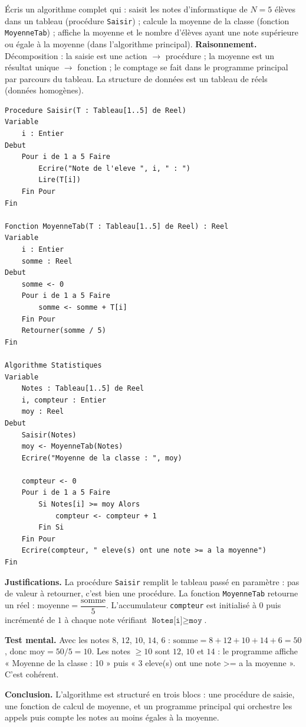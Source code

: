 \documentclass[11pt]{article}
\begin{document}
\begin{exoresolu}
Écris un algorithme complet qui : saisit les notes d'informatique de $N = 5$ élèves dans un tableau (procédure \texttt{Saisir}) ; calcule la moyenne de la classe (fonction \texttt{MoyenneTab}) ; affiche la moyenne et le nombre d'élèves ayant une note supérieure ou égale à la moyenne (dans l'algorithme principal).
\tcblower
\textbf{Raisonnement.} Décomposition : la saisie est une action $\rightarrow$ procédure ; la moyenne est un résultat unique $\rightarrow$ fonction ; le comptage se fait dans le programme principal par parcours du tableau. La structure de données est un tableau de réels (données homogènes).

\begin{lstlisting}
Procedure Saisir(T : Tableau[1..5] de Reel)
Variable
    i : Entier
Debut
    Pour i de 1 a 5 Faire
        Ecrire("Note de l'eleve ", i, " : ")
        Lire(T[i])
    Fin Pour
Fin

Fonction MoyenneTab(T : Tableau[1..5] de Reel) : Reel
Variable
    i : Entier
    somme : Reel
Debut
    somme <- 0
    Pour i de 1 a 5 Faire
        somme <- somme + T[i]
    Fin Pour
    Retourner(somme / 5)
Fin

Algorithme Statistiques
Variable
    Notes : Tableau[1..5] de Reel
    i, compteur : Entier
    moy : Reel
Debut
    Saisir(Notes)
    moy <- MoyenneTab(Notes)
    Ecrire("Moyenne de la classe : ", moy)

    compteur <- 0
    Pour i de 1 a 5 Faire
        Si Notes[i] >= moy Alors
            compteur <- compteur + 1
        Fin Si
    Fin Pour
    Ecrire(compteur, " eleve(s) ont une note >= a la moyenne")
Fin
\end{lstlisting}

\textbf{Justifications.} La procédure \texttt{Saisir} remplit le tableau passé en paramètre : pas de valeur à retourner, c'est bien une procédure. La fonction \texttt{MoyenneTab} retourne un réel : $\text{moyenne} = \dfrac{\text{somme}}{5}$. L'accumulateur \texttt{compteur} est initialisé à $0$ puis incrémenté de $1$ à chaque note vérifiant $\texttt{Notes[i]} \geq \texttt{moy}$.

\textbf{Test mental.} Avec les notes $8$, $12$, $10$, $14$, $6$ : $\text{somme} = 8+12+10+14+6 = 50$, donc $\text{moy} = 50/5 = 10$. Les notes $\geq 10$ sont $12$, $10$ et $14$ : le programme affiche « Moyenne de la classe : 10 » puis « 3 eleve(s) ont une note >= a la moyenne ». C'est cohérent.

\textbf{Conclusion.} L'algorithme est structuré en trois blocs : une procédure de saisie, une fonction de calcul de moyenne, et un programme principal qui orchestre les appels puis compte les notes au moins égales à la moyenne.
\end{exoresolu}
\end{document}
